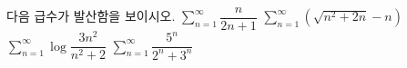 다음 급수가 발산함을 보이시오.
 $\displaystyle\sum_{n=1}^{\infty}\dfrac{n}{2n+1}$
 $\displaystyle\sum_{n=1}^{\infty}(\sqrt{n^2+2n}-n)$
 $\displaystyle\sum_{n=1}^{\infty}\log\dfrac{3n^2}{n^2+2}$
 $\displaystyle\sum_{n=1}^{\infty}\dfrac{5^n}{2^n+3^n}$
